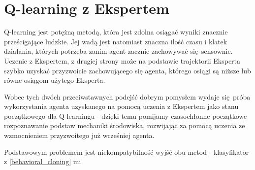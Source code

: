 \section{Q-learning z Ekspertem}
Q-learning jest potężną metodą, która jest zdolna osiągać wyniki znacznie prześcigające ludzkie. Jej wadą jest natomiast znaczna ilość czasu i klatek działania, których potrzeba zanim agent zacznie zachowywać się sensownie. Uczenie z Ekspertem, z drugiej strony może na podstawie trajektorii Eksperta szybko uzyskać przyzwoicie zachowującego się agenta, którego osiągi są niższe lub równe osiągom użytego Eksperta.

Wobec tych dwóch przeciwstawnych podejść dobrym pomysłem wydaje się próba wykorzystania agenta uzyskanego na pomocą uczenia z Ekspertem jako stanu początkowego dla Q-learningu - dzięki temu pomijamy czasochłonne początkowe rozpoznawanie podstaw mechaniki środowiska, rozwijając za pomocą uczenia ze wzmocnieniem przyzwoitego już wcześniej agenta.

Podstawowym problemem jest niekompatybilność wyjść obu metod - klasyfikator z \ref{behavioral_cloning} mi
